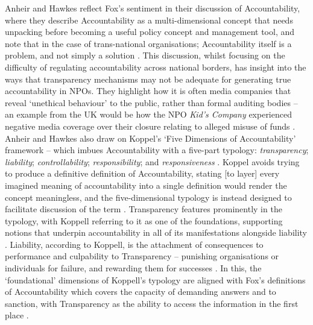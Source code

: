 Anheir and Hawkes reflect Fox's sentiment in their discussion of Accountability, where they describe Accountability as a multi-dimensional concept that needs unpacking before becoming a useful policy concept and management tool, and note that in the case of trans-national organisations; Accountability itself is a problem, and not simply a solution \cite{anheier_accountability_2009}. This discussion, whilst focusing on the difficulty of regulating accountability across national borders, has insight into the ways that transparency mechanisms may not be adequate for generating true accountability in NPOs. They highlight how it is often media companies that reveal `unethical behaviour' to the public, rather than formal auditing bodies -- an example from the UK would be how the NPO \textit{Kid's Company} experienced negative media coverage over their closure relating to alleged misuse of funds \cite{elgot_kids_2015, anheier_accountability_2009}. Anheir and Hawkes also draw on Koppel's `Five Dimensions of Accountability' framework -- which imbues Accountability with a five-part typology: \textit{transparency}; \textit{liability}; \textit{controllability}; \textit{responsibility}; and \textit{responsiveness} \cite{anheier_accountability_2009, koppell_pathologies_2005}.
%
Koppel avoids trying to produce a definitive definition of Accountability, stating [to layer] every imagined meaning of accountability into a single definition would render the concept meaningless, and the five-dimensional typology is instead designed to facilitate discussion of the term \cite{koppell_pathologies_2005}. Transparency features prominently in the typology, with Koppell referring to it as one of the foundations, supporting notions that underpin accountability in all of its manifestations alongside liability \cite{koppell_pathologies_2005}. Liability, according to Koppell, is the attachment of consequences to performance and culpability to Transparency -- punishing organisations or individuals for failure, and rewarding them for successes \cite{koppell_pathologies_2005}. In this, the `foundational' dimensions of Koppell's typology are aligned with Fox's definitions of Accountability which covers the capacity of demanding answers and to sanction, with Transparency as the ability to access the information in the first place \cite{koppell_pathologies_2005, fox_uncertain_2007}.
%
